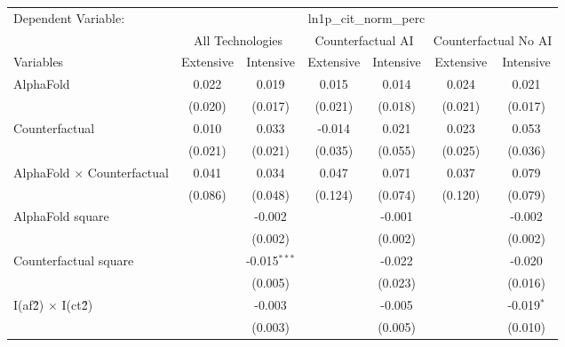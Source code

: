 \begingroup
\centering
\begin{tabular}{lcccccc}
   \tabularnewline \midrule \midrule
   Dependent Variable: & \multicolumn{6}{c}{ln1p\_cit\_norm\_perc}\\
 & \multicolumn{2}{c}{All Technologies} & \multicolumn{2}{c}{Counterfactual AI} & \multicolumn{2}{c}{Counterfactual No AI} \\
\cmidrule(lr){1-1}\cmidrule(lr){2-3} \cmidrule(lr){4-5} \cmidrule(lr){6-7}
Variables & \multicolumn{1}{c}{Extensive} & \multicolumn{1}{c}{Intensive} & \multicolumn{1}{c}{Extensive} & \multicolumn{1}{c}{Intensive} & \multicolumn{1}{c}{Extensive} & \multicolumn{1}{c}{Intensive} \\
\cmidrule(lr){1-1}\cmidrule(lr){2-2} \cmidrule(lr){3-3} \cmidrule(lr){4-4} \cmidrule(lr){5-5} \cmidrule(lr){6-6} \cmidrule(lr){7-7}
   AlphaFold                          & 0.022   & 0.019          & 0.015   & 0.014   & 0.024   & 0.021\\   
                                      & (0.020) & (0.017)        & (0.021) & (0.018) & (0.021) & (0.017)\\   
   Counterfactual                     & 0.010   & 0.033          & -0.014  & 0.021   & 0.023   & 0.053\\   
                                      & (0.021) & (0.021)        & (0.035) & (0.055) & (0.025) & (0.036)\\   
   AlphaFold $\times$ Counterfactual  & 0.041   & 0.034          & 0.047   & 0.071   & 0.037   & 0.079\\   
                                      & (0.086) & (0.048)        & (0.124) & (0.074) & (0.120) & (0.079)\\   
   AlphaFold square                   &         & -0.002         &         & -0.001  &         & -0.002\\   
                                      &         & (0.002)        &         & (0.002) &         & (0.002)\\   
   Counterfactual square              &         & -0.015$^{***}$ &         & -0.022  &         & -0.020\\   
                                      &         & (0.005)        &         & (0.023) &         & (0.016)\\   
   I(af\^2) $\times$ I(ct\^2)         &         & -0.003         &         & -0.005  &         & -0.019$^{*}$\\   
                                      &         & (0.003)        &         & (0.005) &         & (0.010)\\   

\end{tabular}
